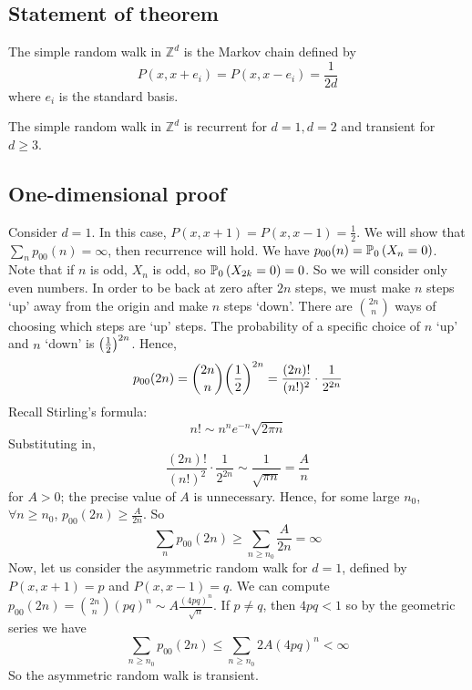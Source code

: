 \subsection{Statement of theorem}
\begin{definition}
	The simple random walk in \( \mathbb Z^d \) is the Markov chain defined by
	\[
		P(x,x+e_i) = P(x,x-e_i) = \frac{1}{2d}
	\]
	where \( e_i \) is the standard basis.
\end{definition}
\begin{theorem}
	The simple random walk in \( \mathbb Z^d \) is recurrent for \( d = 1, d = 2 \) and transient for \( d \geq 3 \).
\end{theorem}

\subsection{One-dimensional proof}
Consider \( d = 1 \).
In this case, \( P(x,x+1) = P(x,x-1) = \frac{1}{2} \).
We will show that \( \sum_n p_{00}(n) = \infty \), then recurrence will hold.
We have \( p_{00}(n) = \mathbb{P}_{0}\left({X_n = 0}\right) \).
Note that if \( n \) is odd, \( X_n \) is odd, so \( \mathbb{P}_{0}\left({X_{2k} = 0}\right) = 0 \).
So we will consider only even numbers.
In order to be back at zero after \( 2n \) steps, we must make \( n \) steps `up' away from the origin and make \( n \) steps `down'.
There are \( \binom{2n}{n} \) ways of choosing which steps are `up' steps.
The probability of a specific choice of \( n \) `up' and \( n \) `down' is \( \qty(\frac{1}{2})^{2n} \).
Hence,
\[
	p_{00}(2n) = \binom{2n}{n} \qty(\frac{1}{2})^{2n} = \frac{(2n)!}{(n!)^2} \cdot \frac{1}{2^{2n}}
\]
Recall Stirling's formula:
\[
	n!
	\sim n^n e^{-n} \sqrt{2 \pi n}
\]
Substituting in,
\[
	\frac{(2n)!}{(n!)^2} \cdot \frac{1}{2^{2n}} \sim \frac{1}{\sqrt{\pi n}} = \frac{A}{n}
\]
for \( A > 0 \); the precise value of \( A \) is unnecessary.
Hence, for some large \( n_0 \), \( \forall n \geq n_0 \), \( p_{00}(2n) \geq \frac{A}{2n} \).
So
\[
	\sum_n p_{00}(2n) \geq \sum_{n \geq n_0} \frac{A}{2n} = \infty
\]
Now, let us consider the asymmetric random walk for \( d = 1 \), defined by \( P(x,x+1) = p \) and \( P(x,x-1) = q \).
We can compute \( p_{00}(2n) = \binom{2n}{n} (pq)^n \sim A \frac{(4pq)^n}{\sqrt{n}} \).
If \( p \neq q \), then \( 4pq < 1 \) so by the geometric series we have
\[
	\sum_{n \geq n_0} p_{00}(2n) \leq \sum_{n \geq n_0} 2A (4pq)^n < \infty
\]
So the asymmetric random walk is transient.

